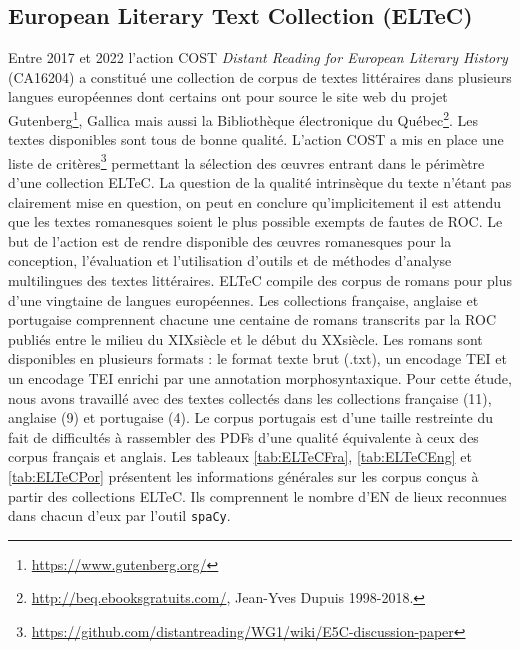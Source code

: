 \subsection{European Literary Text Collection (ELTeC)}

Entre 2017 et 2022 l'action COST \textit{Distant Reading for European Literary History} (CA16204) a constitué une collection de corpus de textes littéraires dans plusieurs langues européennes dont certains ont pour source le site web du projet Gutenberg\footnote{\url{https://www.gutenberg.org/}}, Gallica mais aussi la Bibliothèque électronique du Québec\footnote{\url{http://beq.ebooksgratuits.com/}, Jean-Yves Dupuis 1998-2018.}. Les textes disponibles sont tous de bonne qualité. L'action COST a mis en place une liste de critères\footnote{\url{https://github.com/distantreading/WG1/wiki/E5C-discussion-paper}} permettant la sélection des œuvres entrant dans le périmètre d'une collection ELTeC. La question de la qualité intrinsèque du texte n'étant pas clairement mise en question, on peut en conclure qu'implicitement il est attendu que les textes romanesques soient le plus possible exempts de fautes de ROC. Le but de l'action est de rendre disponible des œuvres romanesques pour la conception, l'évaluation et l'utilisation d'outils et de méthodes d'analyse multilingues des textes littéraires. ELTeC compile des corpus de romans pour plus d'une vingtaine de langues européennes. Les collections française, anglaise et portugaise comprennent chacune une centaine de romans transcrits par la ROC publiés entre le milieu du XIX\ieme{}siècle et le début du XX\ieme{}siècle. Les romans sont disponibles en plusieurs formats : le format texte brut (.txt), un encodage TEI et un encodage TEI enrichi par une annotation morphosyntaxique.
Pour cette étude, nous avons travaillé avec des textes collectés dans les collections française (11), anglaise (9) et portugaise (4). Le corpus portugais est d'une taille restreinte du fait de difficultés à rassembler des PDFs d'une qualité équivalente à ceux des corpus français et anglais. Les tableaux \ref{tab:ELTeCFra}, \ref{tab:ELTeCEng} et \ref{tab:ELTeCPor} présentent les informations générales sur les corpus conçus à partir des collections ELTeC. Ils comprennent le nombre d'EN de lieux reconnues dans chacun d'eux par l'outil \texttt{spaCy}.


